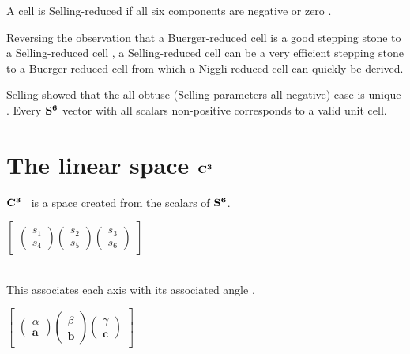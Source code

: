 \documentclass[preprint]{iucr}              %
\numberwithin{equation}{section}
\newcommand{\SVI}[0]{$\bf{S^{6}}$}
\newcommand{\CIII}[0]{$\bf{C^{3}}$}
\begin{document}
		 		{ A cell is Selling-reduced if all six components are negative or zero \cite{Delaunay1932}.  
			\item Reversing the  observation that a Buerger-reduced cell is a good stepping stone to a Selling-reduced cell \cite{Allmann1968},
			a Selling-reduced cell can be a very efficient stepping stone to a Buerger-reduced cell from which a Niggli-reduced cell can quickly be derived.
			\item {Selling showed that the all-obtuse (Selling parameters all-negative) case is unique \cite{Selling1874}.
			 Every \SVI{} vector with all scalars non-positive corresponds to a valid unit cell.}









\section{The linear space \CIII{}}
\label{C3}


	\CIII{}~ is a space created from the scalars of \SVI{}. \\
		\vspace{.1cm}
	
\begin{center}
		$\begin{bmatrix}
		\begin{pmatrix}
			s_1 \\
			s_4
		\end{pmatrix}
		\begin{pmatrix}
			s_2 \\
			s_5
		\end{pmatrix}
		\begin{pmatrix}
			s_3 \\
			s_6
		\end{pmatrix}
	\end{bmatrix}$\\
\end{center}	
    ~~\\
	This associates each axis with its associated angle \cite{Andrews2019b}. 
	~~\\
	
	\begin{center}
		$\begin{bmatrix}
			\begin{pmatrix}
				\alpha   \\
				\textbf{a}
			\end{pmatrix}
			\begin{pmatrix}
				\beta   \\
				\textbf{b}
			\end{pmatrix}
			\begin{pmatrix}
				\gamma   \\
				\textbf{c}
			\end{pmatrix}
		\end{bmatrix}$
	\end{center}			
	

}
\end{document}
